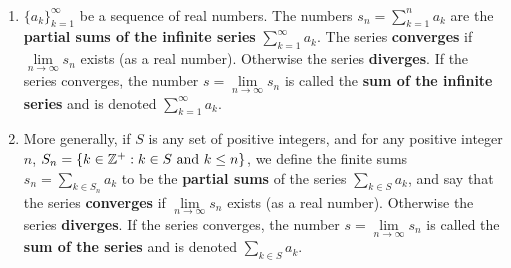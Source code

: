 \begin{defn}\label{d:convergesequence}%
~
\begin{enumerate}
	\item $\{a_k\}_{k = 1}^\infty$ be a sequence of real numbers. The numbers 
	$s_n = \sum\limits_{k = 1}^n a_k$ are the \textbf{partial sums of the infinite 
	series} $\sum\limits_{k = 1}^\infty a_k$. The series \textbf{converges} if 
	$\lim\limits_{n\to\infty}s_n$ exists (as a real number). Otherwise the series 
	\textbf{diverges}. If the series converges, the number $s = \lim\limits_{n\to\infty}
	s_n$ is called the \textbf{sum of the infinite series} and is denoted 
	$\sum\limits_{k = 1}^\infty a_k$. 
	\item More generally, if $S$ is any set of positive integers, and for any 
	positive integer $n$, $S_n = \{k \in \mathbb{Z}^+:k\in S \text{ and }k\le n\}$, 
	we define the finite sums $s_n = \sum\limits_{k \in S_n} a_k$ to be the 
	\textbf{partial sums} of the series $\sum\limits_{k \in S}a_k$, and say that 
	the series \textbf{converges} if $\lim\limits_{n\to\infty}s_n$ exists (as a 
	real number). Otherwise the series \textbf{diverges}. If the series converges, 
	the number $s = \lim\limits_{n\to\infty}s_n$ is called the \textbf{sum of the 
	series} and is denoted $\sum\limits_{k \in S}a_k$. 
\end{enumerate}
\end{defn}


